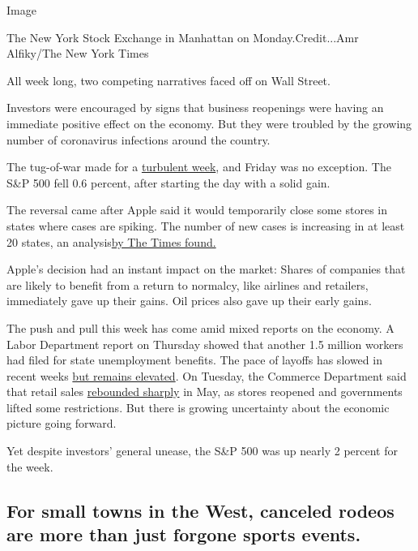 Image

The New York Stock Exchange in Manhattan on Monday.Credit...Amr
Alfiky/The New York Times

All week long, two competing narratives faced off on Wall Street.

Investors were encouraged by signs that business reopenings were having
an immediate positive effect on the economy. But they were troubled by
the growing number of coronavirus infections around the country.

The tug-of-war made for a
\href{https://www.nytimes3xbfgragh.onion/2020/06/19/business/economy/theres-probably-never-been-more-uncertainty-fed-official-warns.html}{turbulent
week}, and Friday was no exception. The S\&P 500 fell 0.6 percent, after
starting the day with a solid gain.

The reversal came after Apple said it would temporarily close some
stores in states where cases are spiking. The number of new cases is
increasing in at least 20 states, an
analysis\href{https://www.nytimes3xbfgragh.onion/interactive/2020/us/coronavirus-us-cases.html}{by
The Times found.}

Apple's decision had an instant impact on the market: Shares of
companies that are likely to benefit from a return to normalcy, like
airlines and retailers, immediately gave up their gains. Oil prices also
gave up their early gains.

The push and pull this week has come amid mixed reports on the economy.
A Labor Department report on Thursday showed that another 1.5 million
workers had filed for state unemployment benefits. The pace of layoffs
has slowed in recent weeks
\href{https://www.nytimes3xbfgragh.onion/2020/06/18/business/economy/coronavirus-unemployment-claims.html}{but
remains elevated}. On Tuesday, the Commerce Department said that retail
sales
\href{https://www.nytimes3xbfgragh.onion/2020/06/16/business/may-retail-sales.html}{rebounded
sharply} in May, as stores reopened and governments lifted some
restrictions. But there is growing uncertainty about the economic
picture going forward.

Yet despite investors' general unease, the S\&P 500 was up nearly 2
percent for the week.

\hypertarget{for-small-towns-in-the-west-canceled-rodeos-are-more-than-just-forgone-sports-events}{%
\subsection{For small towns in the West, canceled rodeos are more than
just forgone sports
events.}\label{for-small-towns-in-the-west-canceled-rodeos-are-more-than-just-forgone-sports-events}}

